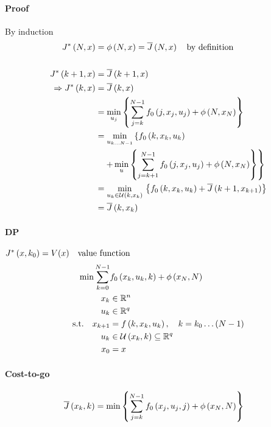 \paragraph{Proof} By induction
\begin{align*}
    J^* \paren{N,x} &= \phi \paren{N,x} = \Jbar{N,x} \quad \txt{by definition}\\
    \\
    J^* \paren{k+1,x} &= \Jbar{k+1,x}\\
    \Rightarrow J^* \paren{k,x} &= \Jbar{k,x}\\
        &= \min_{u_j} \set{ \sum_{j=k}^{N-1} f_0 \paren{j,x_j,u_j} + \phi \paren{N,x_N} }\\
        &= \min_{u_{k\dots N-1}} \left\lbrace f_0 \paren{k,x_k,u_k} \right.\\
            &\quad \left. + \min_u \set{\sum_{j=k+1}^{N-1} f_0 \paren{j,x_j,u_j} + \phi \paren{N,x_N} } \right\rbrace\\
        & =\minuk{} \set{f_0 \paren{k,x_k,u_k} + \Jbar{k+1,\x{k+1}}}\\
        & = \Jbar{k,x_k}
\end{align*}


\paragraph{DP} $J^* \left( x,k_0 \right) = V(x) \quad \textnormal{value function}$
\begin{align*}
    \min \sum_{k=0}^{N-1} & f_0 \paren{x_k,u_k,k} + \phi \paren{x_N,N}\\
    x_k &\in \R^n\\
    u_k &\in \R^q
    \\
\txt{s.t.} \quad \x{k+1} &= f \paren{k,x_k,u_k},\quad k=k_0 \dots (N-1)\\
    u_k &\in \setU{x_k,k} \subseteq \R^q\\
    x_0 &= x
\end{align*}%
%
\paragraph{Cost-to-go}
\begin{align*}
    \Jbar{x_k,k} &= \min \set{\sum_{j=k}^{N-1} f_0 \paren{x_j,u_j,j} + \phi \paren{x_N,N}}
\end{align*}%
%
